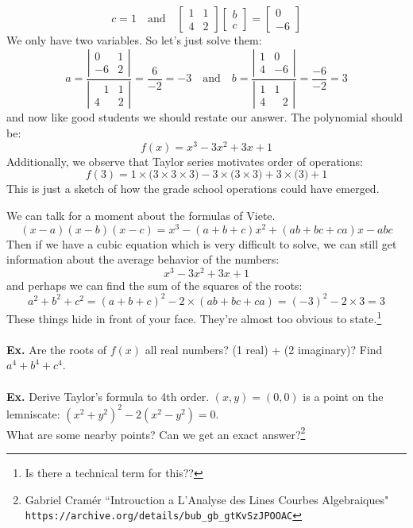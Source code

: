 \documentclass[12pt]{article}
\begin{document}
$$ c = 1  \quad\text{and}\quad 
\left[ 
\begin{array}{rr} 
 1 & 1  \\
 4 & 2 \end{array}\right]
\left[ 
\begin{array}{r} 
b  \\
c  \end{array}\right] = 
\left[ 
\begin{array}{r} 
0 \\
-6 \end{array}\right] 
$$
We only have two variables. So let's just solve them:
$$ 
a = \frac{
\left| 
\begin{array}{rr} 
 0 & 1  \\
 -6 & 2 \end{array}\right|
}{\left| 
\begin{array}{rr} 
 \;\;\;1 & 1  \\
 4 & 2 \end{array}\right|} = \frac{6}{-2}=-3
\quad\text{and}\quad
 b = \frac{
 \left| 
\begin{array}{rr} 
 1 & 0  \\
 4 & -6 \end{array}\right|
 }{\left| 
\begin{array}{rr} 
 1 & 1  \\
 4 & \;\;\,2 \end{array}\right|} = \frac{-6}{-2}=3$$
and now like good students we should restate our answer.  The polynomial should be:
$$ f(x) = x^3 -3x^2 + 3x + 1$$
Additionally, we observe that Taylor series motivates order of operations:
$$ f(3) = 1 \times\big(3 \times 3 \times 3\big) - 3 \times \big(3 \times 3\big) + 3 \times \big(3\big) + 1 $$
This is just a sketch of how the grade school operations could have emerged. 

\newpage 
\noindent 
We can talk for a moment about the formulas of Viete. 
$$ (x-a)(x-b)(x-c) = x^3 - (a+b+c)x^2 + (ab+bc+ca)x -abc $$
Then if we have a cubic equation which is very difficult to solve, we can still get information about the average behavior of the numbers:
$$ x^3 - 3x^2 + 3x + 1$$
and perhaps we can find the sum of the squares of the roots:
$$ a^2 + b^2 + c^2 = 
(a+b+c)^2 - 2 \times (ab + bc + ca) = (-3)^2 - 2 \times 3 = 3 $$
These things hide  in front of your face.  They're almost too obvious to state.\footnote{Is there a technical term for this??} \\ \\
\textbf{Ex.} Are the roots of $f(x)$ all real numbers? (1 real) + (2 imaginary)?  Find $a^4 + b^4 + c^4$. \\ \\
\textbf{Ex.} Derive Taylor's formula to 4th order.  $(x,y)=(0,0)$ is a point on the lemniscate: $(x^2 + y^2)^2 - 2(x^2 - y^2)=0$. \\ What are some nearby points?  Can we get an exact answer?\footnote{Gabriel Cram\'{e}r ``Introuction a L'Analyse des Lines Courbes Algebraiques" \\ \texttt{https://archive.org/details/bub\_gb\_gtKvSzJPOOAC}} 
\end{document}
